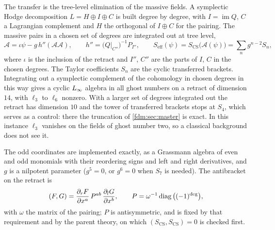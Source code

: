 The transfer is the tree-level elimination of the massive fields.
A symplectic Hodge decomposition $L = H \oplus I \oplus C$ is built degree by degree, with $I = \operatorname{im} Q$, $C$ a Lagrangian complement and $H$ the orthogonal of $I \oplus C$ for the pairing.
The massive pairs in a chosen set of degrees are integrated out at tree level,
\begin{equation}
  \label{fdm:eq:cs:transfer}
  \mathcal A
    = \iota \psi - g \, h''(\mathcal A \mathcal A),
  \qquad
  h''
    = \big( Q \vert_{C''} \big)^{-1} P_{I''},
  \qquad
  S_{\mathrm{eff}}(\psi)
    = S_{\mathrm{CS}}\big( \mathcal A(\psi) \big)
    = \sum_n g^{n - 2} S_n,
\end{equation}
where $\iota$ is the inclusion of the retract and $I''$, $C''$ are the parts of $I$, $C$ in the chosen degrees.
The Taylor coefficients $S_n$ are the cyclic transferred brackets.
Integrating out a symplectic complement of the cohomology in chosen degrees in this way gives a cyclic $L_\infty$ algebra in all ghost numbers on a retract of dimension $14$, with $\ell_3$ to $\ell_6$ nonzero.
With a larger set of degrees integrated out the retract has dimension $10$ and the tower of transferred brackets stops at $S_4$, which serves as a control: there the truncation of \cref{fdm:sec:master} is exact.
In this instance $\ell_3$ vanishes on the fields of ghost number two, so a classical background does not see it.

The odd coordinates are implemented exactly, as a Grassmann algebra of even and odd monomials with their reordering signs and left and right derivatives, and $g$ is a nilpotent parameter ($g^5 = 0$, or $g^6 = 0$ when $S_7$ is needed).
The antibracket on the retract is
\begin{equation}
  \label{fdm:eq:cs:antibracket}
  (F, G)
    = \frac{\partial_r F}{\partial x^a} \, P^{ab} \, \frac{\partial_l G}{\partial x^b},
  \qquad
  P
    = \omega^{-1} \operatorname{diag}\big( (-1)^{\deg} \big),
\end{equation}
with $\omega$ the matrix of the pairing; $P$ is antisymmetric, and is fixed by that requirement and by the parent theory, on which $(S_{\mathrm{CS}}, S_{\mathrm{CS}}) = 0$ is checked first.

